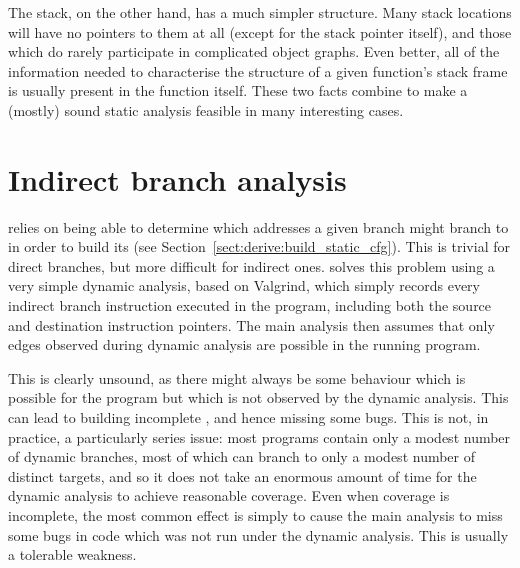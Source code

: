 The stack, on the other hand, has a much simpler structure.  Many
stack locations will have no pointers to them at all (except for the
stack pointer itself), and those which do rarely participate in
complicated object graphs.  Even better, all of the information needed
to characterise the structure of a given function's stack frame is
usually present in the function itself.  These two facts combine to
make a (mostly) sound static analysis feasible in many interesting
cases.


\section{Indirect branch analysis}
\label{sect:program_model:indirect_branches}


{\Technique} relies on being able to determine which addresses a given
branch might branch to in order to build its  (see
Section~\ref{sect:derive:build_static_cfg}).  This is trivial for
direct branches, but more difficult for indirect ones.
{\Implementation} solves this problem using a very simple dynamic
analysis, based on Valgrind\needCite{}, which simply records every
indirect branch instruction executed in the program, including both
the source and destination instruction pointers.  The main analysis
then assumes that only edges observed during dynamic analysis are
possible in the running program.

This is clearly unsound, as there might always be some behaviour which
is possible for the program but which is not observed by the dynamic
analysis.  This can lead to {\technique} building incomplete
, and hence missing some bugs.  This is not, in
practice, a particularly series issue: most programs contain only a
modest number of dynamic branches, most of which can branch to only a
modest number of distinct targets, and so it does not take an enormous
amount of time for the dynamic analysis to achieve reasonable
coverage.  Even when coverage is incomplete, the most common effect is
simply to cause the main analysis to miss some bugs in code which was
not run under the dynamic analysis.  This is usually a tolerable
weakness.

